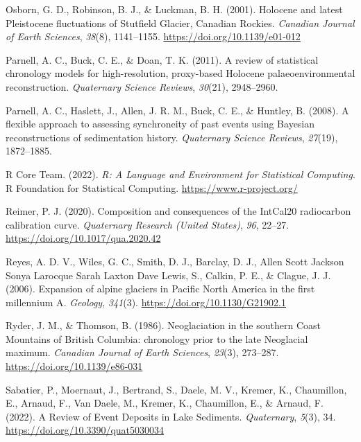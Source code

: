 \documentclass[
  letterpaper,
  DIV=11,
  numbers=noendperiod]{scrartcl}
\newlength{\cslhangindent}
\newlength{\cslentryspacingunit} %
\newenvironment{CSLReferences}[2] %
 {%
  \setlength{\parindent}{0pt}
  \ifodd #1
  \let\oldpar\par
  \def\par{\hangindent=\cslhangindent\oldpar}
  \fi
  \setlength{\parskip}{#2\cslentryspacingunit}
 }%
 {}
\begin{document}
\begin{CSLReferences}{1}{0}
\leavevmode{}%
Osborn, G. D., Robinson, B. J., \& Luckman, B. H. (2001). {Holocene and
latest Pleistocene fluctuations of Stutfield Glacier, Canadian Rockies}.
\emph{Canadian Journal of Earth Sciences}, \emph{38}(8), 1141--1155.
\url{https://doi.org/10.1139/e01-012}

\leavevmode{}%
Parnell, A. C., Buck, C. E., \& Doan, T. K. (2011). {A review of
statistical chronology models for high-resolution, proxy-based Holocene
palaeoenvironmental reconstruction}. \emph{Quaternary Science Reviews},
\emph{30}(21), 2948--2960.

\leavevmode{}%
Parnell, A. C., Haslett, J., Allen, J. R. M., Buck, C. E., \& Huntley,
B. (2008). {A flexible approach to assessing synchroneity of past events
using Bayesian reconstructions of sedimentation history}.
\emph{Quaternary Science Reviews}, \emph{27}(19), 1872--1885.

\leavevmode{}%
R Core Team. (2022). \emph{{R: A Language and Environment for
Statistical Computing}}. R Foundation for Statistical Computing.
\url{https://www.r-project.org/}

\leavevmode{}%
Reimer, P. J. (2020). {Composition and consequences of the IntCal20
radiocarbon calibration curve}. \emph{Quaternary Research (United
States)}, \emph{96}, 22--27. \url{https://doi.org/10.1017/qua.2020.42}

\leavevmode{}%
Reyes, A. D. V., Wiles, G. C., Smith, D. J., Barclay, D. J., Allen Scott
Jackson Sonya Larocque Sarah Laxton Dave Lewis, S., Calkin, P. E., \&
Clague, J. J. (2006). {Expansion of alpine glaciers in Pacific North
America in the first millennium A}. \emph{Geology}, \emph{341}(3).
\url{https://doi.org/10.1130/G21902.1}

\leavevmode{}%
Ryder, J. M., \& Thomson, B. (1986). {Neoglaciation in the southern
Coast Mountains of British Columbia: chronology prior to the late
Neoglacial maximum}. \emph{Canadian Journal of Earth Sciences},
\emph{23}(3), 273--287. \url{https://doi.org/10.1139/e86-031}

\leavevmode{}%
Sabatier, P., Moernaut, J., Bertrand, S., Daele, M. V., Kremer, K.,
Chaumillon, E., Arnaud, F., Van Daele, M., Kremer, K., Chaumillon, E.,
\& Arnaud, F. (2022). {A Review of Event Deposits in Lake Sediments}.
\emph{Quaternary}, \emph{5}(3), 34.
\url{https://doi.org/10.3390/quat5030034}


\end{CSLReferences}
\end{document}
